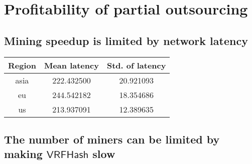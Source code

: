 \section{Profitability of partial outsourcing}
\label{sec:partial-outsourcing}

\subsection{Mining speedup is limited by network latency}

\begin{table}
    \centering
    \begin{tabular}{|c|c|c|}
        \hline
        Region     & Mean latency & Std. of latency \\\hline
        asia   & 222.432500    & 20.921093    \\\hline
        eu     & 244.542182    & 18.354686    \\\hline
        us     & 213.937091    & 12.389635    \\\hline
    \end{tabular}
\end{table}



\subsection{The number of miners can be limited by making $\mathsf{VRFHash}$ slow}